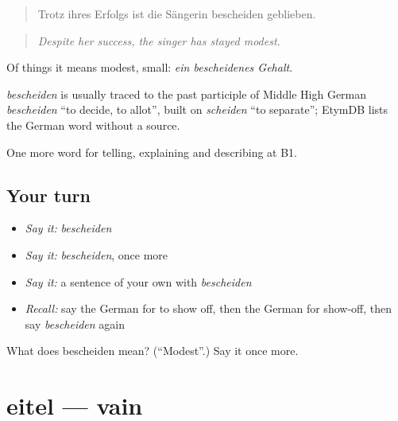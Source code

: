 \begin{quote}
Trotz ihres Erfolgs ist die Sängerin bescheiden geblieben.
\end{quote}

\begin{quote}
\emph{Despite her success, the singer has stayed modest.}
\end{quote}

Of things it means modest, small: \emph{ein bescheidenes Gehalt}.

\begin{cousinweb}
\emph{bescheiden} is usually traced to the past participle of Middle High German \emph{bescheiden} \textquotedblleft{}to decide, to allot\textquotedblright{}, built on \emph{scheiden} \textquotedblleft{}to separate\textquotedblright{}; EtymDB lists the German word without a source.
\end{cousinweb}

\begin{grammarlens}[title={What you've built}]
One more word for telling, explaining and describing at B1.
\end{grammarlens}

\subsection*{Your turn}
\begin{itemize}
\raggedright
  \item \emph{Say it:} \emph{bescheiden}
  \item \emph{Say it:} \emph{bescheiden}, once more
  \item \emph{Say it:} a sentence of your own with \emph{bescheiden}
  \item \emph{Recall:} say the German for to show off, then the German for show-off, then say \emph{bescheiden} again
\end{itemize}

\begin{tcolorbox}[breakable,colback=teal!4,colframe=teal!35!black,title={Before you move on}]
What does bescheiden mean? (\textquotedblleft{}Modest\textquotedblright{}.) Say it once more.
\end{tcolorbox}
\section[eitel]{eitel — vain}

\label{lesson:GE-C475-eitel}



